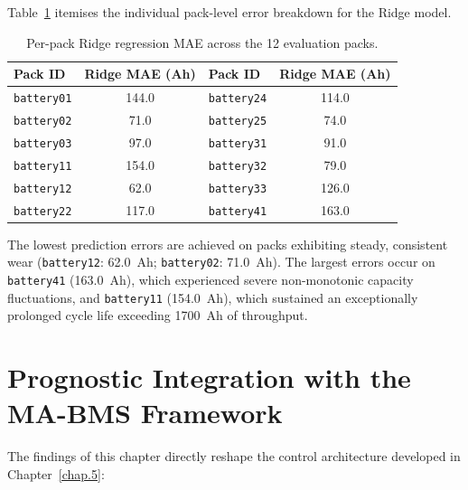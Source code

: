 Table~\ref{tab:per_pack_mae} itemises the individual pack-level error
breakdown for the Ridge model.

\begin{table}[htbp]
  \centering
  \caption{Per-pack Ridge regression MAE across the 12 evaluation packs.}
  \label{tab:per_pack_mae}
  \begin{tabular}{lc|lc}
    \toprule
    \textbf{Pack ID} & \textbf{Ridge MAE (Ah)} & \textbf{Pack ID} & \textbf{Ridge MAE (Ah)} \\
    \midrule
    \texttt{battery01} & 144.0 & \texttt{battery24} & 114.0 \\
    \texttt{battery02} &  71.0 & \texttt{battery25} &  74.0 \\
    \texttt{battery03} &  97.0 & \texttt{battery31} &  91.0 \\
    \texttt{battery11} & 154.0 & \texttt{battery32} &  79.0 \\
    \texttt{battery12} &  62.0 & \texttt{battery33} & 126.0 \\
    \texttt{battery22} & 117.0 & \texttt{battery41} & 163.0 \\
    \bottomrule
  \end{tabular}
\end{table}

The lowest prediction errors are achieved on packs exhibiting steady,
consistent wear (\texttt{battery12}: \SI{62.0}{Ah}; \texttt{battery02}:
\SI{71.0}{Ah}). The largest errors occur on \texttt{battery41}
(\SI{163.0}{Ah}), which experienced severe non-monotonic capacity
fluctuations, and \texttt{battery11} (\SI{154.0}{Ah}), which sustained
an exceptionally prolonged cycle life exceeding \SI{1700}{Ah} of throughput.

\section{Prognostic Integration with the MA-BMS Framework}

The findings of this chapter directly reshape the control architecture
developed in Chapter~\ref{chap.5}:

